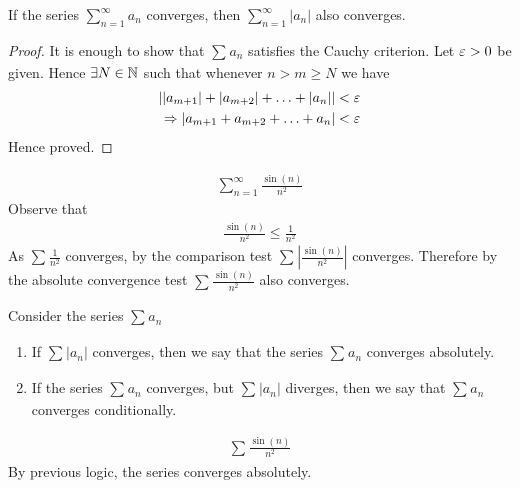 
\begin{theorem}
	If the series $\sum_{n=1}^{\infty} a_n$ converges, then $\sum_{n=1}^{\infty} \left|a_n\right|$ also converges.
\end{theorem}

\begin{proof}
	It is enough to show that $\sum_{}^{} a_n$ satisfies the Cauchy criterion. Let $\e > 0$ be given. Hence $\exists N \in \mathbb{N}$ such that whenever $n > m \ge N$ we have
	\begin{align}
		\left|\left|a_{m+1}\right| + \left|a_{m+2}\right| + \ldots + \left|a_n\right|\right| < \e \\
		\implies \left|a_{m+1} + a_{m+2} + \ldots + a_n\right| < \e
	\end{align}
	Hence proved.
\end{proof}

\begin{eg}
	\begin{align}
		\sum_{n=1}^{\infty} \frac{\sin\left( n \right) }{n^{2}}
	\end{align}
	Observe that 
	\begin{align}
		\frac{\sin\left( n \right) }{n^{2}} \le \frac{1}{n^{2}}
	\end{align}
	As $\sum_{}^{} \frac{1}{n^{2}}$ converges, by the comparison test $\sum_{}^{} \left|\frac{\sin\left( n \right) }{n^{2}}\right|$ converges. Therefore by the absolute convergence test $\sum_{}^{} \frac{\sin\left( n \right) }{n^{2}}$ also converges.
\end{eg}

\begin{definition}
	Consider the series $\sum_{}^{} a_n$
	\begin{enumerate}
		\item If $\sum_{}^{} \left|a_n\right|$ converges, then we say that the series $\sum_{}^{} a_n$ converges absolutely.
		\item If the series $\sum_{}^{} a_n$ converges, but $\sum_{}^{} \left|a_n\right|$ diverges, then we say that $\sum_{}^{} a_n$ converges conditionally.
	\end{enumerate}
\end{definition}

\begin{eg}
	\begin{align}
		\sum_{}^{} \frac{\sin\left( n \right) }{n^{2}}
	\end{align}
	By previous logic, the series converges absolutely.
\end{eg}

